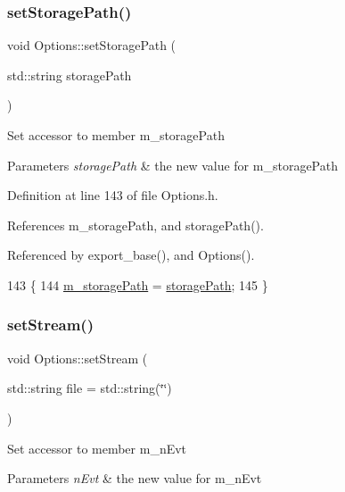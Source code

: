 \subsubsection{\texorpdfstring{set\+Storage\+Path()}{setStoragePath()}}
{\footnotesize\ttfamily void Options\+::set\+Storage\+Path (\begin{DoxyParamCaption}\item[{std\+::string}]{storage\+Path }\end{DoxyParamCaption})\hspace{0.3cm}{\ttfamily [inline]}}

Set accessor to member m\+\_\+storage\+Path 
\begin{DoxyParams}{Parameters}
{\em storage\+Path} & the new value for m\+\_\+storage\+Path \\
\hline
\end{DoxyParams}


Definition at line 143 of file Options.\+h.



References m\+\_\+storage\+Path, and storage\+Path().



Referenced by export\+\_\+base(), and Options().


\begin{DoxyCode}
143                                                     \{
144                 \hyperlink{classOptions_ad125e827cb30bc9b63875ec45b31ef5e}{m\_storagePath} = \hyperlink{classOptions_a3992b9247441a3e60e55c8c5fe32b394}{storagePath};
145         \}
\end{DoxyCode}
\mbox{\label{classOptions_af7df7a64e597f0bed79ca979f8144daa}} 
\subsubsection{\texorpdfstring{set\+Stream()}{setStream()}}
{\footnotesize\ttfamily void Options\+::set\+Stream (\begin{DoxyParamCaption}\item[{std\+::string}]{file = {\ttfamily std\+:\+:string(\char`\"{}\char`\"{})} }\end{DoxyParamCaption})\hspace{0.3cm}{\ttfamily [inline]}}

Set accessor to member m\+\_\+n\+Evt 
\begin{DoxyParams}{Parameters}
{\em n\+Evt} & the new value for m\+\_\+n\+Evt \\
\hline
\end{DoxyParams}


